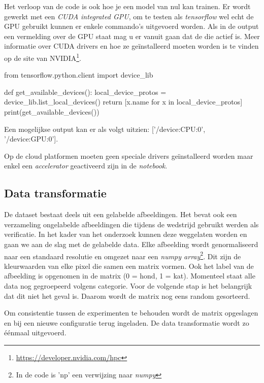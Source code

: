 Het verloop van de code is ook hoe je een model van nul kan trainen. Er wordt gewerkt met een \textit{CUDA integrated GPU}, om te testen als \textit{tensorflow} wel echt de GPU gebruikt kunnen er enkele commando's uitgevoerd worden. Als in de output een vermelding over de GPU staat mag u er vanuit gaan dat de die actief is. Meer informatie over CUDA drivers en hoe ze geïnstalleerd moeten worden is te vinden op de site van NVIDIA\footnote{\url{https://developer.nvidia.com/hpc}}.

\bigskip

\begin{python}
from tensorflow.python.client import device_lib

def get_available_devices():
    local_device_protos = device_lib.list_local_devices()
    return [x.name for x in local_device_protos]
print(get_available_devices()) 
\end{python}

Een mogelijkse output kan er als volgt uitzien: ['/device:CPU:0', '/device:GPU:0'].

Op de cloud platformen moeten geen speciale drivers geïnstalleerd worden maar enkel een \textit{accelerator} geactiveerd zijn in de \textit{notebook}.

\subsection{Data transformatie}
\label{subsec:autokeras-tranform}

De dataset bestaat deels uit een gelabelde afbeeldingen. Het bevat ook een verzameling ongelabelde afbeeldingen die tijdens de wedstrijd gebruikt werden als verificatie. In het kader van het onderzoek kunnen deze weggelaten worden en gaan we aan de slag met de gelabelde data. Elke afbeelding wordt genormaliseerd naar een standaard resolutie en omgezet naar een \textit{numpy array}\footnote{In de code is 'np' een verwijzing naar \textit{numpy}}. Dit zijn de kleurwaarden van elke pixel die samen een matrix vormen. Ook het label van de afbeelding is opgenomen in de matrix (0 = hond, 1 = kat). Momenteel staat alle data nog gegroepeerd volgens categorie. Voor de volgende stap is het belangrijk dat dit niet het geval is. Daarom wordt de matrix nog eens random gesorteerd.

Om consistentie tussen de experimenten te behouden wordt de matrix opgeslagen en bij een nieuwe configuratie terug ingeladen. De data transformatie wordt zo éénmaal uitgevoerd.

\bigskip

